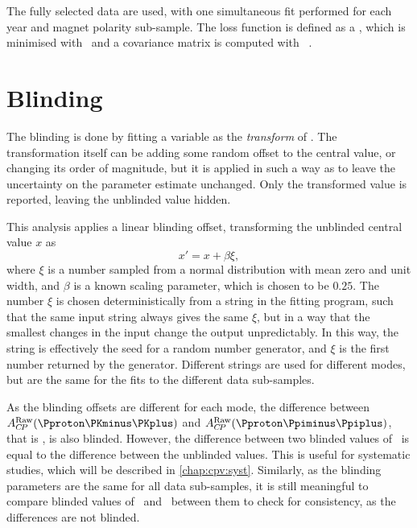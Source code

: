 The fully selected data are used, with one simultaneous fit performed for each
year and magnet polarity sub-sample.
The loss function is defined as a \chisq, which is minimised with \migrad\ and
a covariance matrix is computed with \hesse~\cite{James:1975dr,James:1994vla}.

\section{Blinding}
\label{chap:cpv:araw:blinding}

The blinding is done by fitting a variable as the \emph{transform} of \ARaw.
The transformation itself can be adding some random offset to the central
value, or changing its order of magnitude, but it is applied in such a way as
to leave the uncertainty on the parameter estimate unchanged.
Only the transformed value is reported, leaving the unblinded value hidden.

This analysis applies a linear blinding offset, transforming the unblinded
central value $x$ as
\begin{equation}
  x' = x + \beta\xi,
\end{equation}
where $\xi$ is a number sampled from a normal distribution with mean zero and
unit width, and $\beta$ is a known scaling parameter, which is chosen to be
$0.25$.
The number $\xi$ is chosen deterministically from a string in the fitting
program, such that the same input string always gives the same $\xi$, but in a
way that the smallest changes in the input change the output unpredictably.
In this way, the string is effectively the seed for a random number generator,
and $\xi$ is the first number returned by the generator.
Different strings are used for different modes, but are the same for the fits
to the different data sub-samples.

As the blinding offsets are different for each mode, the difference between
$\ARaw(\pKK)$ and $\ARaw(\ppipi)$, that is \dACP, is also blinded.
However, the difference between two blinded values of \dACP\ is equal to the
difference between the unblinded values.
This is useful for systematic studies, which will be described in
\cref{chap:cpv:syst}.
Similarly, as the blinding parameters are the same for all data sub-samples, it
is still meaningful to compare blinded values of \ARaw\ and \dACP\ between them
to check for consistency, as the differences are not blinded.

